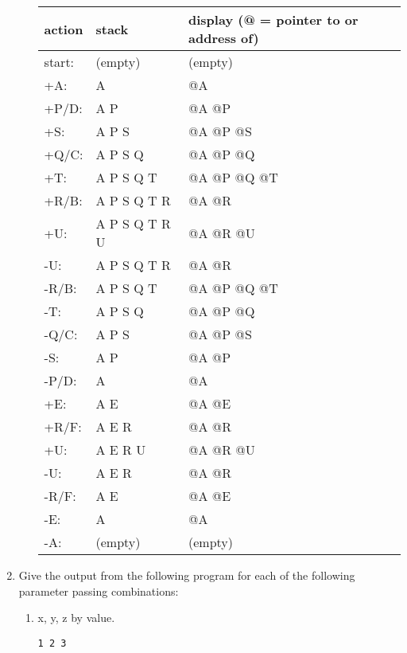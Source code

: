 \documentclass[12pt,letterpaper]{article}
\begin{document}
\begin{enumerate}
\begin{enumerate}
          \begin{tabular}{l l l}
            action & stack & display (@ = pointer to or address of) \\
            \hline
            start: & (empty)        & (empty) \\
            +A:    & A              & @A \\
            +P/D:  & A P            & @A @P \\
            +S:    & A P S          & @A @P @S \\
            +Q/C:  & A P S Q        & @A @P @Q \\
            +T:    & A P S Q T      & @A @P @Q @T\\
            +R/B:  & A P S Q T R    & @A @R \\
            +U:    & A P S Q T R U  & @A @R @U \\
            -U:    & A P S Q T R    & @A @R \\
            -R/B:  & A P S Q T      & @A @P @Q @T \\
            -T:    & A P S Q        & @A @P @Q \\
            -Q/C:  & A P S          & @A @P @S \\
            -S:    & A P            & @A @P \\
            -P/D:  & A              & @A \\
            +E:    & A E            & @A @E \\
            +R/F:  & A E R          & @A @R \\
            +U:    & A E R U        & @A @R @U \\
            -U:    & A E R          & @A @R \\
            -R/F:  & A E            & @A @E \\
            -E:    & A              & @A \\
            -A:    & (empty)        & (empty) \\
          \end{tabular}
      \end{enumerate}

      \item Give the output from the following program for each of the following parameter passing combinations:

      \begin{enumerate}
        \item x, y, z by value.

          \texttt{1 2 3}


\end{enumerate}
\end{enumerate}
\end{document}

